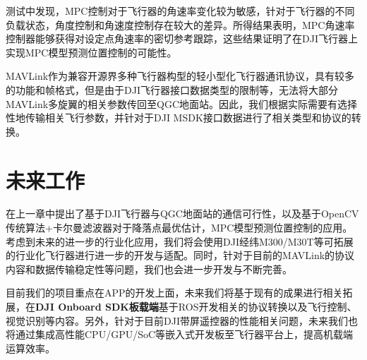 测试中发现，MPC控制对于飞行器的角速率变化较为敏感，针对于飞行器的不同负载状态，角度控制和角速度控制存在较大的差异。所得结果表明，MPC角速率控制器能够获得对设定点角速率的密切参考跟踪，这些结果证明了在DJI飞行器上实现MPC模型预测位置控制的可能性\cite{ArtE8}。

MAVLink作为兼容开源界多种飞行器构型的轻小型化飞行器通讯协议，具有较多的功能和帧格式，但是由于DJI飞行器接口数据类型的限制等，无法将大部分MAVLink多旋翼的相关参数传回至QGC地面站。因此，我们根据实际需要有选择性地传输相关飞行参数，并针对于DJI MSDK接口数据进行了相关类型和协议的转换。

\section{未来工作}

在上一章中提出了基于DJI飞行器与QGC地面站的通信可行性，以及基于OpenCV传统算法+卡尔曼滤波器对于降落点最优估计，MPC模型预测位置控制的应用。考虑到未来的进一步的行业化应用，我们将会使用DJI经纬M300/M30T等可拓展的行业化飞行器进行进一步的开发与适配。同时，针对于目前的MAVLink的协议内容和数据传输稳定性等问题，我们也会进一步开发与不断完善。

目前我们的项目重点在APP的开发上面，未来我们将基于现有的成果进行相关拓展，在\textbf{DJI Onboard SDK板载端}基于ROS开发相关的协议转换以及飞行控制、视觉识别等内容。另外，针对于目前DJI带屏遥控器的性能相关问题，未来我们也将通过集成高性能CPU/GPU/SoC等嵌入式开发板至飞行器平台上，提高机载端运算效率。

